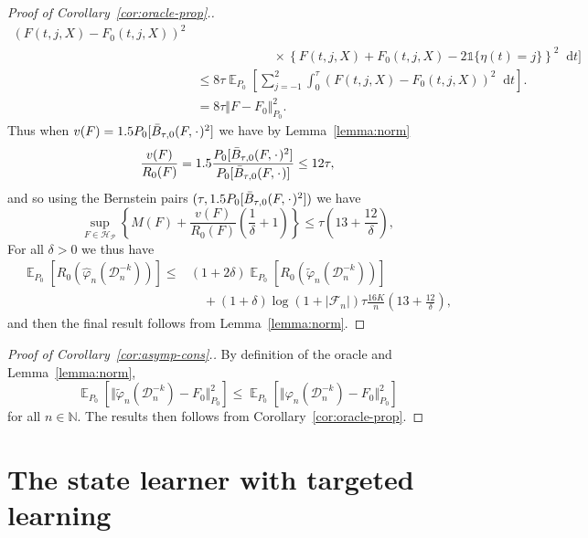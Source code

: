 \documentclass[numsec,webpdf,contemporary,medium,namedate]{oup-authoring-template}%
\theoremstyle{thmstyleone}%
\theoremstyle{thmstyletwo}%
\theoremstyle{thmstylethree}%
\DeclareMathOperator{\E}{\mathbb{E}} %
\newcommand{\N}{\mathbb{N}}
\newcommand{\blank}{\makebox[1ex]{\textbf{$\cdot$}}}
\renewcommand{\phi}{\varphi}
\newcommand*\diff{\mathop{}\!\mathrm{d}}
\newcommand{\1}{\mathds{1}}
\newcommand{\data}{\ensuremath{\mathcal{D}}}
\begin{document}
\begin{appendices}
\begin{proof}[Proof of Corollary~\ref{cor:oracle-prop}.]
\begin{align*}
    \left(
    F(t, j, X) - F_0(t, j, X)
    \right)^2
  \\
  & \quad \quad \quad\quad \quad \quad \times
    \left\{
    F(t, j, X) +  F_0(t, j, X)-2 \1{\{\eta(t) = j\}}
    \right\}^2
    \diff t 
    \Bigg]
  \\
  & \leq
    8\tau \E_{P_0}{\left[
    \sum_{j=-1}^{2} \int_0^{\tau}
    \left(
    F(t, j, X) - F_0(t, j, X)
    \right)^2
    \diff t 
    \right]}.
  \\
  & =
    8\tau \Vert F - F_0 \Vert_{P_0}^2.
\end{align*}
Thus when \( v(F) = 1.5 P_0{[\bar{B}_{\tau,0}(F, \blank)^2]} \) we have by
Lemma~\ref{lemma:norm}
\begin{equation*}
  \frac{v(F)}{R_0(F)}
  = 1.5 \frac{P_0{[\bar{B}_{\tau,0}(F, \blank)^2]}}{P_0{[\bar{B}_{\tau,0}(F, \blank)]}}
  \leq 12 \tau,
\end{equation*}
and so using the Bernstein pairs \( (\tau, 1.5 P_0{[\bar{B}_{\tau,0}(F, \blank)^2]}) \) we have
\begin{equation*}
  \sup_{F \in \mathcal{H}_{\mathcal{P}}}
  \left\{
    M(F) + \frac{v(F)}{R_0(F)}
    \left(
      \frac{1}{\delta} + 1
    \right)
  \right\}
  \leq \tau
  \left(
    13 + \frac{12}{\delta}
  \right),
\end{equation*}
For all $\delta>0$ we thus have
\begin{align*}
  \E_{P_0}{\left[ R_0(\hat{\phi}_n(\data_n^{-k})) \right]}
  \leq
  &(1+2\delta)\E_{P_0}{\left[ R_0(\tilde{\phi}_n(\data_n^{-k})) \right]}
  \\
  & \quad
    + (1+\delta)\log(1 + |\mathcal{F}_n|) \tau \frac{16 K}{n}
    \left(
    13 + \frac{12}{\delta}
    \right),
\end{align*}
and then the final result follows from Lemma~\ref{lemma:norm}.
\end{proof}

\begin{proof}[Proof of Corollary~\ref{cor:asymp-cons}.]
  By definition of the oracle and Lemma~\ref{lemma:norm},
  \begin{equation*}
    \E_{P_0}{\left[ \Vert \tilde{\phi}_n(\data_n^{-k}) - F_0 \Vert_{P_0}^2
      \right]} \leq \E_{P_0}{\left[ \Vert \phi_n(\data_n^{-k}) - F_0 \Vert_{P_0}^2
      \right]}  
  \end{equation*}
  for all \( n \in \N \). The results then follows from
  Corollary~\ref{cor:oracle-prop}.
\end{proof}


\section{The state learner with targeted learning}
\label{sec:state-learner-with}


\end{appendices}
\end{document}
